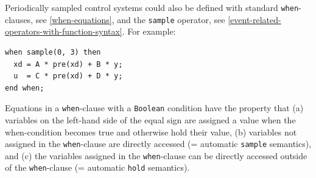 \begin{nonnormative}
Periodically sampled control systems could also be defined with standard \lstinline!when!-clauses, see \cref{when-equations}, and the \lstinline!sample! operator, see \cref{event-related-operators-with-function-syntax}.
For example:
\begin{lstlisting}[language=modelica]
when sample(0, 3) then
  xd = A * pre(xd) + B * y;
  u  = C * pre(xd) + D * y;
end when;
\end{lstlisting}

Equations in a \lstinline!when!-clause with a \lstinline!Boolean! condition have the property that (a) variables on the left-hand side of the equal sign are assigned a value when the when-condition becomes true and otherwise hold their value, (b) variables not assigned in the \lstinline!when!-clause are directly accessed (= automatic \lstinline!sample! semantics), and (c) the variables assigned in the \lstinline!when!-clause can be directly accessed outside of the \lstinline!when!-clause (= automatic \lstinline!hold! semantics).


\end{nonnormative}
